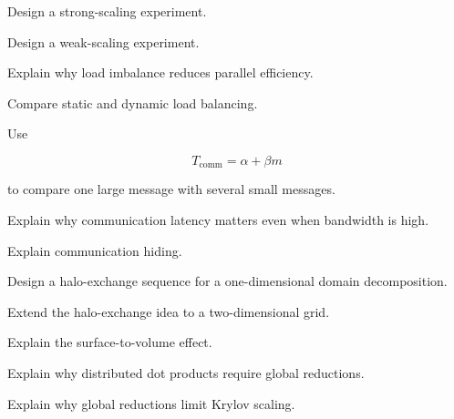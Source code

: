 \begin{exercise}[3]
Design a strong-scaling experiment.
\end{exercise}

\begin{exercise}[3]
Design a weak-scaling experiment.
\end{exercise}

\begin{exercise}[3]
Explain why load imbalance reduces parallel efficiency.
\end{exercise}

\begin{exercise}[3]
Compare static and dynamic load balancing.
\end{exercise}

\begin{exercise}[2]
Use

\[
T_{\mathrm{comm}}
=
\alpha+\beta m
\]

to compare one large message with several small messages.
\end{exercise}

\begin{exercise}[3]
Explain why communication latency matters even when bandwidth is high.
\end{exercise}

\begin{exercise}[3]
Explain communication hiding.
\end{exercise}

\begin{exercise}[3]
Design a halo-exchange sequence for a one-dimensional domain
decomposition.
\end{exercise}

\begin{exercise}[3]
Extend the halo-exchange idea to a two-dimensional grid.
\end{exercise}

\begin{exercise}[3]
Explain the surface-to-volume effect.
\end{exercise}

\begin{exercise}[3]
Explain why distributed dot products require global reductions.
\end{exercise}

\begin{exercise}[3]
Explain why global reductions limit Krylov scaling.
\end{exercise}

